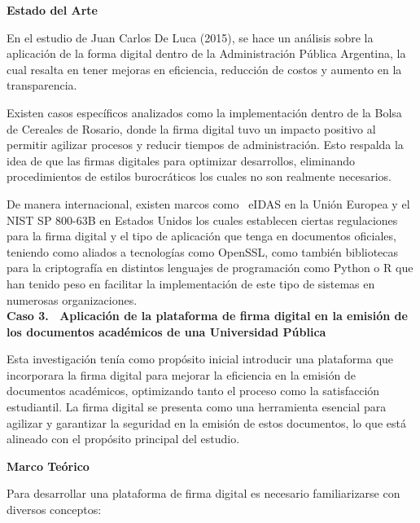 \documentclass[a4paper,12pt]{article}
\begin{document}
{\small {\selectfont 	\textbf{Estado del Arte}}}

{\small {\selectfont 	En el estudio de Juan Carlos De Luca (2015), se hace un análisis sobre la aplicación de la forma digital dentro de la Administración Pública Argentina, la cual resalta en tener mejoras en eficiencia, reducción de costos y aumento en la transparencia.}}

{\small {\selectfont 	Existen casos específicos analizados como la implementación dentro de la Bolsa de Cereales de Rosario, donde la firma digital tuvo un impacto positivo al permitir agilizar procesos y reducir tiempos de administración. Esto respalda la idea de que las firmas digitales para optimizar desarrollos, eliminando procedimientos de estilos burocráticos los cuales no son realmente necesarios. }}

{\small {\selectfont 	De manera internacional, existen marcos como \ eIDAS en la Unión Europea y el NIST SP 800-63B en Estados Unidos los cuales establecen ciertas regulaciones para la firma digital y el tipo de aplicación que tenga en documentos oficiales, teniendo como aliados a tecnologías como OpenSSL, como también bibliotecas para la criptografía en distintos lenguajes de programación como Python o R que han tenido peso en facilitar la implementación de este tipo de sistemas en numerosas organizaciones.}}\\





\textbf{{\selectfont Caso 3. \ Aplicación de la plataforma de firma digital en la emisión de los documentos académicos de una Universidad Pública}}

{\small {\selectfont 	Esta investigación tenía como propósito inicial introducir una plataforma que incorporara la firma digital para mejorar la eficiencia en la emisión de documentos académicos, optimizando tanto el proceso como la satisfacción estudiantil. La firma digital se presenta como una herramienta esencial para agilizar y garantizar la seguridad en la emisión de estos documentos, lo que está alineado con el propósito principal del estudio.}}



{\small {\selectfont \textbf{	Marco Teórico}}}

{\small {\selectfont 	Para desarrollar una plataforma de firma digital es necesario familiarizarse con diversos conceptos:}}
\end{document}
